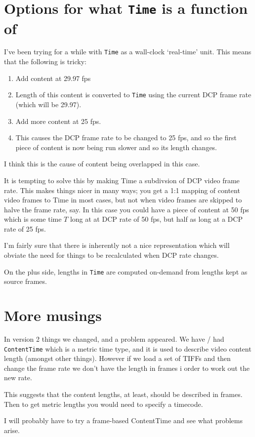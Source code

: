 \documentclass{article}
\begin{document}
\section{Options for what \texttt{Time} is a function of}

I've been trying for a while with \texttt{Time} as a wall-clock
`real-time' unit.  This means that the following is tricky:

\begin{enumerate}
\item Add content at 29.97 fps
\item Length of this content is converted to \texttt{Time} using the
  current DCP frame rate (which will be 29.97).
\item Add more content at 25 fps.
\item This causes the DCP frame rate to be changed to 25 fps, and so
  the first piece of content is now being run slower and so its length
  changes.
\end{enumerate}

I think this is the cause of content being overlapped in this case.

It is tempting to solve this by making Time a subdivsion of DCP video
frame rate.  This makes things nicer in many ways; you get a 1:1
mapping of content video frames to Time in most cases, but not when
video frames are skipped to halve the frame rate, say.  In this case
you could have a piece of content at 50 fps which is some time $T$
long at at DCP rate of 50 fps, but half as long at a DCP rate of 25 fps.

I'm fairly sure that there is inherently not a nice representation which
will obviate the need for things to be recalculated when DCP rate changes.

On the plus side, lengths in \texttt{Time} are computed on-demand from
lengths kept as source frames.


\section{More musings}

In version 2 things we changed, and a problem appeared.  We have / had
\texttt{ContentTime} which is a metric time type, and it is used to
describe video content length (amongst other things).  However if we
load a set of TIFFs and then change the frame rate we don't have the
length in frames i order to work out the new rate.

This suggests that the content lengths, at least, should be described
in frames.  Then to get metric lengths you would need to specify a
timecode.

I will probably have to try a frame-based ContentTime and see what
problems arise.
\end{document}
